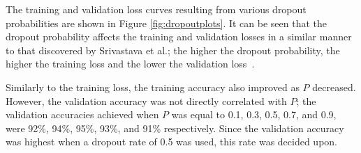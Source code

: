 The training and validation loss curves resulting from various dropout probabilities are shown in Figure \ref{fig:dropoutplots}. It can be seen that the dropout probability affects the training and validation losses in a similar manner to that discovered by Srivastava et al.; the higher the dropout probability, the higher the training loss and the lower the validation loss~\cite{dropout}.

Similarly to the training loss, the training accuracy also improved as $P$ decreased. However, the validation accuracy was not directly correlated with $P$; the validation accuracies achieved when $P$ was equal to 0.1, 0.3, 0.5, 0.7, and 0.9, were 92\%, 94\%, 95\%, 93\%, and 91\% respectively. Since the validation accuracy was highest when a dropout rate of 0.5 was used, this rate was decided upon.

